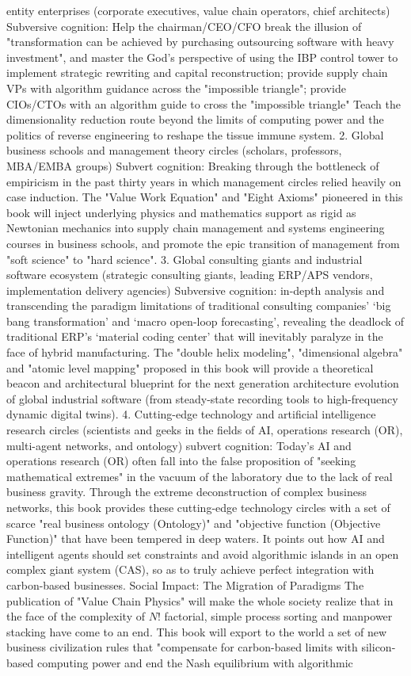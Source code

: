 \documentclass[11pt,a4paper]{article}
\begin{document}
entity enterprises (corporate executives, value chain operators, chief architects) Subversive cognition: Help the chairman/CEO/CFO break the illusion of "transformation can be achieved by purchasing outsourcing software with heavy investment", and master the God's perspective of using the IBP control tower to implement strategic rewriting and capital reconstruction; provide supply chain VPs with algorithm guidance across the "impossible triangle"; provide CIOs/CTOs with an algorithm guide to cross the "impossible triangle" Teach the dimensionality reduction route beyond the limits of computing power and the politics of reverse engineering to reshape the tissue immune system. 2. Global business schools and management theory circles (scholars, professors, MBA/EMBA groups) Subvert cognition: Breaking through the bottleneck of empiricism in the past thirty years in which management circles relied heavily on case induction. The "Value Work Equation" and "Eight Axioms" pioneered in this book will inject underlying physics and mathematics support as rigid as Newtonian mechanics into supply chain management and systems engineering courses in business schools, and promote the epic transition of management from "soft science" to "hard science". 3. Global consulting giants and industrial software ecosystem (strategic consulting giants, leading ERP/APS vendors, implementation delivery agencies) Subversive cognition: in-depth analysis and transcending the paradigm limitations of traditional consulting companies’ ‘big bang transformation’ and ‘macro open-loop forecasting’, revealing the deadlock of traditional ERP’s ‘material coding center’ that will inevitably paralyze in the face of hybrid manufacturing. The "double helix modeling", "dimensional algebra" and "atomic level mapping" proposed in this book will provide a theoretical beacon and architectural blueprint for the next generation architecture evolution of global industrial software (from steady-state recording tools to high-frequency dynamic digital twins). 4. Cutting-edge technology and artificial intelligence research circles (scientists and geeks in the fields of AI, operations research (OR), multi-agent networks, and ontology) subvert cognition: Today's AI and operations research (OR) often fall into the false proposition of "seeking mathematical extremes" in the vacuum of the laboratory due to the lack of real business gravity. Through the extreme deconstruction of complex business networks, this book provides these cutting-edge technology circles with a set of scarce "real business ontology (Ontology)" and "objective function (Objective Function)" that have been tempered in deep waters. It points out how AI and intelligent agents should set constraints and avoid algorithmic islands in an open complex giant system (CAS), so as to truly achieve perfect integration with carbon-based businesses. Social Impact: The Migration of Paradigms The publication of "Value Chain Physics" will make the whole society realize that in the face of the complexity of $N!$ factorial, simple process sorting and manpower stacking have come to an end. This book will export to the world a set of new business civilization rules that "compensate for carbon-based limits with silicon-based computing power and end the Nash equilibrium with algorithmic 
\end{document}
